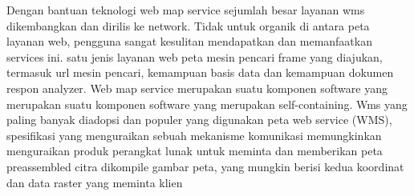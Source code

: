 Dengan bantuan teknologi web map service sejumlah besar layanan wms dikembangkan dan dirilis ke network. Tidak untuk organik di antara
peta layanan web, pengguna sangat kesulitan mendapatkan dan memanfaatkan services ini. satu jenis layanan web peta mesin pencari
frame yang diajukan, termasuk url mesin pencari, kemampuan basis data dan kemampuan dokumen respon analyzer. Web map service merupakan suatu komponen software yang merupakan suatu komponen software yang merupakan self-containing. Wms yang paling banyak  diadopsi dan populer yang digunakan peta web service (WMS), spesifikasi yang menguraikan sebuah mekanisme komunikasi memungkinkan menguraikan produk perangkat lunak untuk meminta dan memberikan peta preassembled citra dikompile gambar peta, yang mungkin berisi kedua koordinat dan data raster yang meminta klien




  
  
